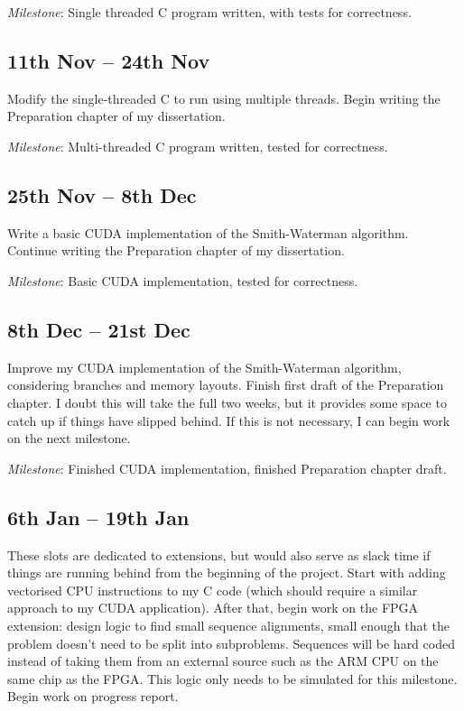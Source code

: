 \nopagebreak
\textit{Milestone}: Single threaded C program written, with tests for correctness.

\subsection*{11th Nov -- 24th Nov}
Modify the single-threaded C to run using multiple threads. Begin writing the Preparation chapter of my dissertation.

\textit{Milestone}: Multi-threaded C program written, tested for correctness.

\subsection*{25th Nov -- 8th Dec}
Write a basic CUDA implementation of the Smith-Waterman algorithm. Continue writing the Preparation chapter of my dissertation.

\textit{Milestone}: Basic CUDA implementation, tested for correctness.

\subsection*{8th Dec -- 21st Dec}
Improve my CUDA implementation of the Smith-Waterman algorithm, considering branches and memory layouts.
Finish first draft of the Preparation chapter.
I doubt this will take the full two weeks, but it provides some space to catch up if things have slipped behind.
If this is not necessary, I can begin work on the next milestone.

\textit{Milestone}: Finished CUDA implementation, finished Preparation chapter draft.

\subsection*{6th Jan -- 19th Jan}

These slots are dedicated to extensions, but would also serve as slack time if things are running behind from the beginning of the project.
Start with adding vectorised CPU instructions to my C code (which should require a similar approach to my CUDA application).
After that, begin work on the FPGA extension: design logic to find small sequence alignments, small enough that the problem doesn't need to be split into subproblems.
Sequences will be hard coded instead of taking them from an external source such as the ARM CPU on the same chip as the FPGA.
This logic only needs to be simulated for this milestone. Begin work on progress report.

